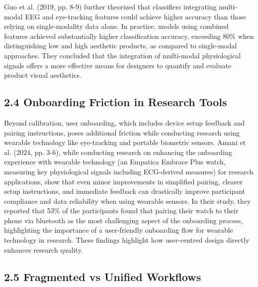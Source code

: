\documentclass[
]{article}
\begin{document}
Guo et al. (2019, pp. 8-9) further theorized that classifiers integrating multi-modal EEG and eye-tracking features could achieve higher accuracy than those relying on single-modality data alone. In practice, models using combined features achieved substantially higher classification accuracy, exceeding 80\% when distinguishing low and high aesthetic products, as compared to single-modal approaches. They concluded that the integration of multi-modal physiological signals offers a more effective means for designers to quantify and evaluate product visual aesthetics.

\hypertarget{onboarding-friction-in-research-tools}{%
\subsection{2.4 Onboarding Friction in Research Tools}\label{onboarding-friction-in-research-tools}}

Beyond calibration, user onboarding, which includes device setup feedback and pairing instructions, poses additional friction while conducting research using wearable technology like eye-tracking and portable biometric sensors. Amani et al. (2024, pp. 3-6), while conducting research on enhancing the onboarding experience with wearable technology (an Empatica Embrace Plus watch, measuring key physiological signals including ECG-derived measures) for research applications, show that even minor improvements in simplified pairing, clearer setup instructions, and immediate feedback can drastically improve participant compliance and data reliability when using wearable sensors. In their study, they reported that 53\% of the participants found that pairing their watch to their phone via bluetooth as the most challenging aspect of the onboarding process, highlighting the importance of a user-friendly onboarding flow for wearable technology in research. These findings highlight how user-centred design directly enhances research quality.

\hypertarget{fragmented-vs-unified-workflows}{%
\subsection{\texorpdfstring{2.5 Fragmented vs Unified Workflows }{2.5 Fragmented vs Unified Workflows }}\label{fragmented-vs-unified-workflows}}
\end{document}
